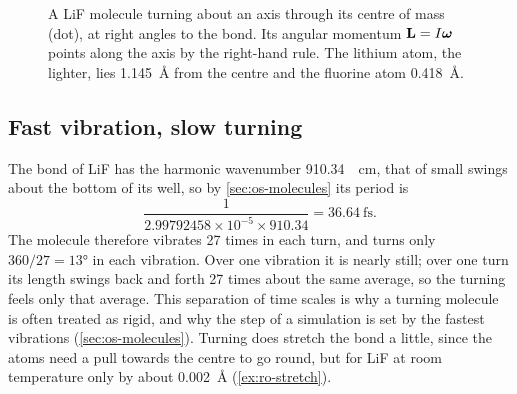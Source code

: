 \begin{figure}[htb]
\centering
{}
\caption{A LiF molecule turning about an axis through its centre of mass
(dot), at right angles to the bond. Its angular momentum $\bm{\mathrm{L}} = I
\boldsymbol{\omega}$ points along the axis by the right-hand rule. The
lithium atom, the lighter, lies \SI{1.145}{\angstrom} from the centre and
the fluorine atom \SI{0.418}{\angstrom}.}
\label{fig:ro-lif}
\end{figure}

\subsection*{Fast vibration, slow turning}

The bond of LiF has the harmonic wavenumber\cite{NISTWebBook}
\SI{910.34}{\per\centi\metre}, that of small swings about the bottom of
its well, so by
\cref{sec:os-molecules} its period is
\begin{equation*}
   \frac{1}{2.99792458\times10^{-5}\times910.34}
   = \SI{36.64}{\femto\second} .
\end{equation*} The molecule therefore vibrates 27 times in each
turn, and turns only $360/27 = \ang{13}$ in each vibration. Over one
vibration it is nearly still; over one turn its length swings back and
forth 27 times about the same average, so the turning feels only that
average.
This separation of time scales is why a turning molecule is often treated
as rigid, and why the step of a simulation is set by the fastest vibrations
(\cref{sec:os-molecules}). Turning does stretch the bond a
little, since the atoms need a pull towards the centre to go round, but
for LiF at room temperature only by about \SI{0.002}{\angstrom}
(\cref{ex:ro-stretch}).

